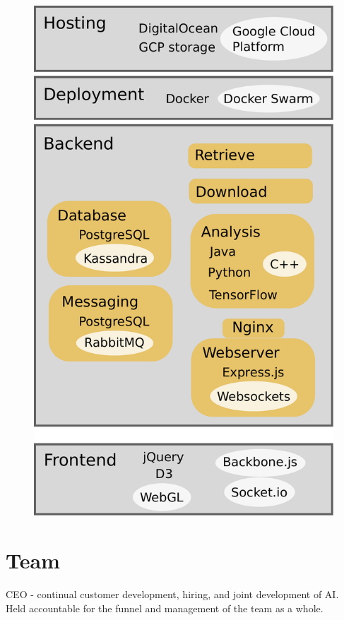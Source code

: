 \documentclass[12pt]{report} %
\begin{document}
\begin{figure}[h]
                \centering
                \includegraphics[width=\columnwidth]{Diagram.pdf}
           \label{fig:BigPicture}
\end{figure}

\section{Team}

CEO - continual customer development, hiring, and joint development of AI. Held accountable for the funnel and management of the team as a whole.\\ 
\end{document}
